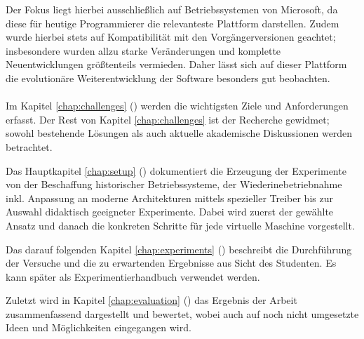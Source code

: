 		Der Fokus liegt hierbei ausschließlich auf Betriebssystemen von Microsoft, da diese für heutige Programmierer die relevanteste Plattform darstellen.
		Zudem wurde hierbei stets auf Kompatibilität mit den Vorgängerversionen geachtet;
		insbesondere wurden allzu starke Veränderungen und komplette Neuentwicklungen größtenteils vermieden. 
		Daher lässt sich auf dieser Plattform die evolutionäre Weiterentwicklung der Software besonders gut beobachten. \\ \\

	

				

		Im Kapitel \ref{chap:challenges} () werden die wichtigsten Ziele und Anforderungen erfasst. 
		Der Rest von Kapitel \ref{chap:challenges} ist der Recherche gewidmet; sowohl bestehende Lösungen als auch aktuelle akademische Diskussionen werden betrachtet.
		
		Das Hauptkapitel \ref{chap:setup} () dokumentiert die Erzeugung der Experimente von der Beschaffung historischer Betriebssysteme, der Wiederinebetriebnahme inkl. Anpassung an moderne Architekturen mittels spezieller Treiber bis zur Auswahl didaktisch geeigneter Experimente.
		Dabei wird zuerst der gewählte Ansatz und danach die konkreten Schritte für jede virtuelle Maschine vorgestellt.
		
		Das darauf folgenden Kapitel \ref{chap:experiments} () beschreibt die Durchführung der Versuche und die zu erwartenden Ergebnisse aus Sicht des Studenten. Es kann später als Experimentierhandbuch verwendet werden.

		Zuletzt wird in Kapitel \ref{chap:evaluation} () das Ergebnis der Arbeit zusammenfassend dargestellt und bewertet, wobei auch auf noch nicht umgesetzte Ideen und Möglichkeiten eingegangen wird.
		

